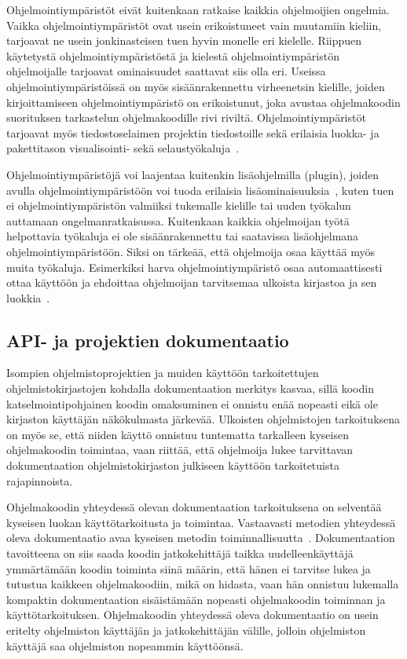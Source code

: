 \documentclass[finnish]{tktltiki2}
\theoremstyle{definition}
\theoremstyle{remark}
\begin{document}
Ohjelmointiympäristöt eivät kuitenkaan ratkaise kaikkia ohjelmoijien ongelmia. Vaikka ohjelmointiympäristöt ovat usein erikoistuneet vain muutamiin kieliin, tarjoavat ne usein jonkinasteisen tuen hyvin monelle eri kielelle. Riippuen käytetystä ohjelmointiympäristöstä ja kielestä ohjelmointiympäristön ohjelmoijalle tarjoavat ominaisuudet saattavat siis olla eri.
Useissa ohjelmointiympäristöissä on myös sisäänrakennettu virheenetsin kielille, joiden kirjoittamiseen ohjelmointiympäristö on erikoistunut, joka avustaa ohjelmakoodin suorituksen tarkastelun ohjelmakoodille rivi riviltä. Ohjelmointiympäristöt tarjoavat myös tiedostoselaimen projektin tiedostoille sekä erilaisia luokka- ja pakettitason visualisointi- sekä selaustyökaluja~\cite{eclipse-ide}.

Ohjelmointiympäristöjä voi laajentaa kuitenkin lisäohjelmilla (plugin), joiden avulla ohjelmointiympäristöön voi tuoda erilaisia lisäominaisuuksia~\cite{eclipse-ide}, kuten tuen ei ohjelmointiympäristön valmiiksi tukemalle kielille tai uuden työkalun auttamaan ongelmanratkaisussa. Kuitenkaan kaikkia ohjelmoijan työtä helpottavia työkaluja ei ole sisäänrakennettu tai saatavissa lisäohjelmana ohjelmointiympäristöön. Siksi on tärkeää, että ohjelmoija osaa käyttää myös muita työkaluja. Esimerkiksi harva ohjelmointiympäristö osaa automaattisesti ottaa käyttöön ja ehdoittaa ohjelmoijan tarvitsemaa ulkoista kirjastoa ja sen luokkia~\cite{jungloid-mining}.

\subsection{API- ja projektien dokumentaatio}

Isompien ohjelmistoprojektien ja muiden käyttöön tarkoitettujen ohjelmistokirjastojen kohdalla dokumentaation merkitys kasvaa, sillä koodin katselmointipohjainen koodin omaksuminen ei onnistu enää nopeasti eikä ole kirjaston käyttäjän näkökulmasta järkevää. Ulkoisten ohjelmistojen tarkoituksena on myös se, että niiden käyttö onnistuu tuntematta tarkalleen kyseisen ohjelmakoodin toimintaa, vaan riittää, että ohjelmoija lukee tarvittavan dokumentaation ohjelmistokirjaston julkiseen käyttöön tarkoitetuista rajapinnoista.

Ohjelmakoodin yhteydessä olevan dokumentaation tarkoituksena on selventää kyseisen luokan käyttötarkoitusta ja toimintaa. Vastaavasti metodien yhteydessä oleva dokumentaatio avaa kyseisen metodin toiminnallisuutta~\cite{javadoc}.
Dokumentaation tavoitteena on siis saada koodin jatkokehittäjä taikka uudelleenkäyttäjä ymmärtämään koodin toiminta siinä määrin, että hänen ei tarvitse lukea ja tutustua kaikkeen ohjelmakoodiin, mikä on hidasta, vaan hän onnistuu lukemalla kompaktin dokumentaation sisäistämään nopeasti ohjelmakoodin toiminnan ja käyttötarkoituksen. Ohjelmakoodin yhteydessä oleva dokumentaatio on usein eritelty ohjelmiston käyttäjän ja jatkokehittäjän välille, jolloin ohjelmiston käyttäjä saa ohjelmiston nopeammin käyttöönsä.
\end{document}
